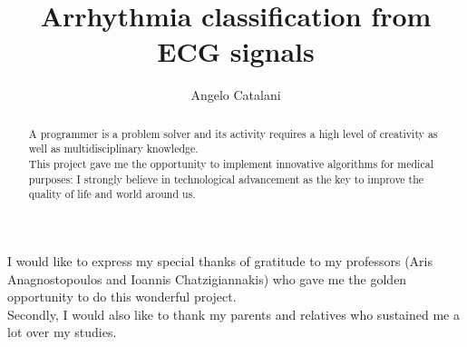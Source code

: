 \documentclass[LaM,binding=0.6cm]{sapthesis}
\title{Arrhythmia classification from ECG signals}
\author{Angelo Catalani}
\begin{document}
\frontmatter

\maketitle

\dedication{Dedicated to\\ my parents}

\begin{abstract}
A programmer is a problem solver and its activity requires a high level of creativity as well as multidisciplinary knowledge.\\This project gave me the opportunity to implement innovative algorithms for medical purposes: I strongly believe in technological advancement as the key to improve the quality of life and world around us.
\end{abstract}

\begin{acknowledgments}
I would like to express my special thanks of gratitude to my professors (Aris Anagnostopoulos and Ioannis Chatzigiannakis) who gave me the golden opportunity to do this wonderful project.\\Secondly, I would also like to thank my parents and relatives who sustained me a lot over my studies.
\end{acknowledgments}

\tableofcontents



\mainmatter
\end{document}
